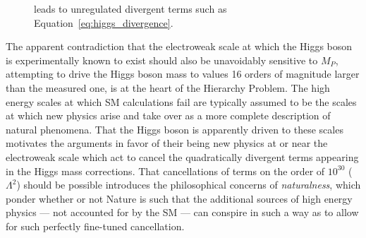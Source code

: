 \begin{description}
\begin{figure}[!htb]
\begin{minipage}{0.8\textwidth}
\begin{center}
{                    leads to unregulated divergent terms such as Equation~\ref{eq:higgs_divergence}.
                }
                \label{fig:higgs_mass_correction}
            \end{center}
        \end{minipage}
        \end{figure}
        The apparent contradiction that the electroweak scale at which the Higgs boson is experimentally known to exist
        should also be unavoidably sensitive to $M_P$, attempting to drive the Higgs boson mass to values 16 orders
        of magnitude larger than the measured one,
        is at the heart of the Hierarchy Problem.
        The high energy scales at which SM calculations fail are typically assumed to be the scales
        at which new physics arise and take over as a more complete description of natural phenomena.
        That the Higgs boson is apparently driven to these scales motivates the arguments in favor
        of their being new physics at or near the electroweak scale which act to cancel the quadratically
        divergent terms appearing in the Higgs mass corrections.
        That cancellations of terms on the order of $10^{30}$ ($\Lambda^2$) should be possible introduces the
        philosophical concerns of \textit{naturalness}, which ponder whether or not Nature is such
        that the additional sources of high energy physics --- not accounted for by the SM --- can conspire in such a way as to
        allow for such perfectly fine-tuned cancellation.
\end{description}
